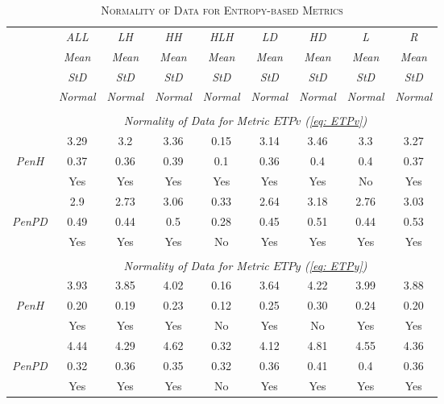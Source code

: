\begin{table}[h]
\centering
\caption{\textsc{Normality of Data for Entropy-based Metrics}}
\begin{tabular*}{1\textwidth}{@{\extracolsep{\fill}} c | c  c  c  c  c  c  c  c}
	& {\textit{ALL}} & {\textit{LH}} & {\textit{HH}} & {\textit{HLH}} & {\textit{LD}} & {\textit{HD}} & {\textit{L}} & {\textit{R}} \\
	\cline{2-9} 
	\cline{2-9} 
	& {\textit{Mean}} & {\textit{Mean}} & {\textit{Mean}} & {\textit{Mean}} & {\textit{Mean}} & {\textit{Mean}} & {\textit{Mean}} & {\textit{Mean}} \\
	& {\textit{StD}} & {\textit{StD}} & {\textit{StD}} & {\textit{StD}} & {\textit{StD}} & {\textit{StD}} & {\textit{StD}} & {\textit{StD}} \\
	& {\textit{Normal}} & {\textit{Normal}} & {\textit{Normal}} & {\textit{Normal}} & {\textit{Normal}} & {\textit{Normal}} & {\textit{Normal}} & {\textit{Normal}} \\
	\cline{2-9}
	\\
	& \multicolumn{8}{c}{\textit{Normality of Data for Metric $ETPv$ (\ref{eq: ETPv})}} \\
	\hline 	\hline
	& 3.29 & 3.2 & 3.36 & 0.15 & 3.14 & 3.46 & 3.3 & 3.27 \\
	{\textit{PenH}} & 0.37 & 0.36 & 0.39 & 0.1 & 0.36 & 0.4 & 0.4 & 0.37 \\
	& Yes & Yes & Yes & Yes & Yes & Yes & No & Yes \\
	\hline
	& 2.9 & 2.73 & 3.06 & 0.33 & 2.64 & 3.18 & 2.76 & 3.03 \\
	{\textit{PenPD}} & 0.49 & 0.44 & 0.5 & 0.28 & 0.45 & 0.51 & 0.44 & 0.53 \\
	& Yes & Yes & Yes & No & Yes & Yes & Yes & Yes \\
	\\
	& \multicolumn{8}{c}{\textit{Normality of Data for Metric $ETPy$ (\ref{eq: ETPy})}} \\
	\hline 	\hline
	& 3.93 & 3.85 & 4.02 & 0.16 & 3.64 & 4.22 & 3.99 & 3.88 \\
	{\textit{PenH}} & 0.20 & 0.19 & 0.23 & 0.12 & 0.25 & 0.30 & 0.24 & 0.20 \\
	& Yes & Yes & Yes & No & Yes & No & Yes & Yes \\
	\hline
	& 4.44 & 4.29 & 4.62 & 0.32 & 4.12 & 4.81 & 4.55 & 4.36 \\
	{\textit{PenPD}} & 0.32 & 0.36 & 0.35 & 0.32 & 0.36 & 0.41 & 0.4 & 0.36 \\
	& Yes & Yes & Yes & No & Yes & Yes & Yes & Yes \\

\end{tabular*}
\end{table}
